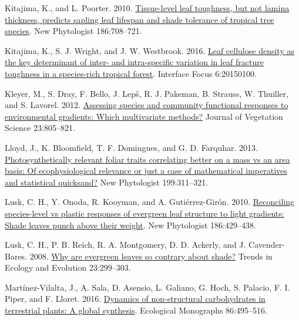 \documentclass[
  12pt,
]{article}
\newlength{\cslhangindent} %
\newlength{\cslentryspacingunit} %
\newenvironment{CSLReferences}[2] %
 {%
  \setlength{\parindent}{0pt} %
  \ifodd #1 %
  \let\oldpar\par %
  \def\par{\hangindent=\cslhangindent\oldpar} %
  \fi %
  \setlength{\parskip}{#2\cslentryspacingunit} %
 }%
 {} %
\begin{document}
\begin{CSLReferences}{1}{0}
\leavevmode{}%
Kitajima, K., and L. Poorter. 2010. \href{https://doi.org/10.1111/j.1469-8137.2010.03212.x}{Tissue-level leaf toughness, but not lamina thickness, predicts sapling leaf lifespan and shade tolerance of tropical tree species}. New Phytologist 186:708--721.

\leavevmode{}%
Kitajima, K., S. J. Wright, and J. W. Westbrook. 2016. \href{https://doi.org/10.1098/rsfs.2015.0100}{Leaf cellulose density as the key determinant of inter- and intra-specific variation in leaf fracture toughness in a species-rich tropical forest}. Interface Focus 6:20150100.

\leavevmode{}%
Kleyer, M., S. Dray, F. Bello, J. Lepš, R. J. Pakeman, B. Strauss, W. Thuiller, and S. Lavorel. 2012. \href{https://doi.org/10.1111/j.1654-1103.2012.01402.x}{Assessing species and community functional responses to environmental gradients: {Which} multivariate methods?} Journal of Vegetation Science 23:805--821.

\leavevmode{}%
Lloyd, J., K. Bloomfield, T. F. Domingues, and G. D. Farquhar. 2013. \href{https://doi.org/10.1111/nph.12281}{Photosynthetically relevant foliar traits correlating better on a mass vs an area basis: {Of} ecophysiological relevance or just a case of mathematical imperatives and statistical quicksand?} New Phytologist 199:311--321.

\leavevmode{}%
Lusk, C. H., Y. Onoda, R. Kooyman, and A. Gutiérrez-Girón. 2010. \href{https://doi.org/10.1111/j.1469-8137.2010.03202.x}{Reconciling species-level vs plastic responses of evergreen leaf structure to light gradients: {Shade} leaves punch above their weight}. New Phytologist 186:429--438.

\leavevmode{}%
Lusk, C. H., P. B. Reich, R. A. Montgomery, D. D. Ackerly, and J. Cavender-Bares. 2008. \href{https://doi.org/10.1016/j.tree.2008.02.006}{Why are evergreen leaves so contrary about shade?} Trends in Ecology and Evolution 23:299--303.

\leavevmode{}%
Martínez-Vilalta, J., A. Sala, D. Asensio, L. Galiano, G. Hoch, S. Palacio, F. I. Piper, and F. Lloret. 2016. \href{https://doi.org/10.1002/ecm.1231}{Dynamics of non-structural carbohydrates in terrestrial plants: A global synthesis}. Ecological Monographs 86:495--516.


\end{CSLReferences}
\end{document}
